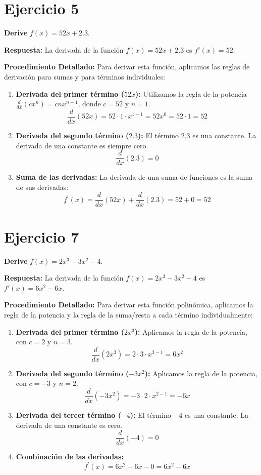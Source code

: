 \documentclass[12pt, a4paper]{article}
\begin{document}
\section{Ejercicio 5}
\textbf{Derive} $f(x)=52x+2.3$.

\textbf{Respuesta:}
La derivada de la función $f(x)=52x+2.3$ es $f'(x)=52$.

\textbf{Procedimiento Detallado:}
Para derivar esta función, aplicamos las reglas de derivación para sumas y para términos individuales:
\begin{enumerate}
    \item \textbf{Derivada del primer término ($52x$):} Utilizamos la regla de la potencia $\frac{d}{dx}(cx^n)=cnx^{n-1}$, donde $c=52$ y $n=1$.
    \[\frac{d}{dx}(52x) = 52 \cdot 1 \cdot x^{1-1}=52x^0=52 \cdot 1=52\]
    \item \textbf{Derivada del segundo término ($2.3$):} El término $2.3$ es una constante. La derivada de una constante es siempre cero.
    \[\frac{d}{dx}(2.3)=0\]
    \item \textbf{Suma de las derivadas:} La derivada de una suma de funciones es la suma de sus derivadas:
    \[f^{\prime}(x)=\frac{d}{dx}(52x)+\frac{d}{dx}(2.3)=52+0=52\]
\end{enumerate}

\section{Ejercicio 7}
\textbf{Derive} $f(x)=2x^3-3x^2-4$.

\textbf{Respuesta:}
La derivada de la función $f(x)=2x^3-3x^2-4$ es $f'(x)=6x^2-6x$.

\textbf{Procedimiento Detallado:}
Para derivar esta función polinómica, aplicamos la regla de la potencia y la regla de la suma/resta a cada término individualmente:
\begin{enumerate}
    \item \textbf{Derivada del primer término ($2x^3$):} Aplicamos la regla de la potencia, con $c=2$ y $n=3$.
    \[\frac{d}{dx}(2x^3)=2 \cdot 3 \cdot x^{3-1}=6x^2\]
    \item \textbf{Derivada del segundo término ($-3x^2$):} Aplicamos la regla de la potencia, con $c=-3$ y $n=2$.
    \[\frac{d}{dx}(-3x^2) = -3 \cdot 2 \cdot x^{2-1}=-6x\]
    \item \textbf{Derivada del tercer término ($-4$):} El término $-4$ es una constante. La derivada de una constante es cero.
    \[\frac{d}{dx}(-4)=0\]
    \item \textbf{Combinación de las derivadas:}
    \[f^{\prime}(x)=6x^2-6x-0=6x^2-6x\]
\end{enumerate}
\end{document}
